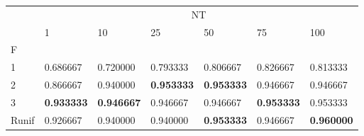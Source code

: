 \begin{table}[htbp]
\centering
\label{iris-results}
\begin{tabular}{lllllll}
\toprule
 & \multicolumn{6}{c}{NT} \\
 & 1 & 10 & 25 & 50 & 75 & 100 \\
F &  &  &  &  &  &  \\
\midrule
1 & 0.686667 & 0.720000 & 0.793333 & 0.806667 & 0.826667 & 0.813333 \\
2 & 0.866667 & 0.940000 & \textbf{0.953333} & \textbf{0.953333} & 0.946667 & 0.946667 \\
3 & \textbf{0.933333} & \textbf{0.946667} & 0.946667 & 0.946667 & \textbf{0.953333} & 0.953333 \\
Runif & 0.926667 & 0.940000 & 0.940000 & \textbf{0.953333} & 0.946667 & \textbf{0.960000} \\
\bottomrule
\end{tabular}
\end{table}
